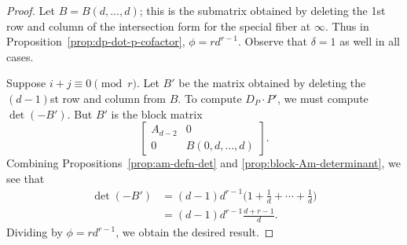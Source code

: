 \documentclass[reqno]{amsart}
\theoremstyle{definition}
\theoremstyle{remark}
\begin{document}
\begin{proof}
  Let $B = B(d, \dots, d)$; this is the submatrix obtained by deleting the 1st row and column of the intersection form for the special fiber at $\infty$. Thus in Proposition~\ref{prop:dp-dot-p-cofactor}, $\phi = rd^{r-1}$. Observe that $\delta = 1$ as well in all cases.

Suppose $i + j \equiv 0 \pmod{r}$. Let $B'$ be the matrix obtained by deleting the $(d-1)$st row and column from $B$. To compute $D_P \cdot P'$, we must compute $\det (-B')$. But $B'$ is the block matrix
\[
\left[\begin{array}{cc}
  A_{d-2} & 0 \\
  0 & B(0,d,\dots,d)
\end{array}\right].
\]
Combining Propositions~\ref{prop:am-defn-det} and \ref{prop:block-Am-determinant}, we see that 
\begin{align*}
  \det (-B') &= (d-1) d^{r-1}\bigg(1 + \frac{1}{d} + \cdots + \frac{1}{d}\bigg) \\
  &= (d-1)d^{r-1}\frac{d + r - 1}{d}.
\end{align*}
Dividing by $\phi = r d^{r-1}$, we obtain the desired result.


\end{proof}
\end{document}
